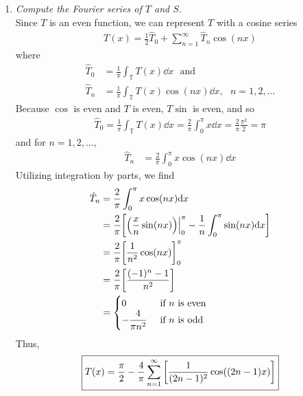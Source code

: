 \documentclass[fontsize=11pt]{article} %
\theoremstyle{plain}
\numberwithin{equation}{section} %
\numberwithin{figure}{section} %
\numberwithin{table}{section} %
\begin{document}
\begin{enumerate}[\bf (a)]
    \item
        \emph{Compute the Fourier series of $T$ and $S$.} \\

        Since $T$ is an even function, we can represent $T$ with a cosine series
        \begin{align*}
            T(x) = \frac{1}{2}\hat{T}_0 + \sum_{n=1}^\infty \hat{T}_n\cos(n x)
        \end{align*}
        where
        \begin{align*}
            \hat{T}_0 &= \frac{1}{\pi}\int_\mathbb{T} T(x) \dd x\ \ \ \text{and}\\
            \hat{T}_n &= \frac{1}{\pi}\int_\mathbb{T} T(x) \cos (nx) \dd x,\ \ \ n = 1, 2, \dots
        \end{align*}
        Because $\cos$ is even and $T$ is even, $T \sin$ is even, and so
        \begin{align*}
            \hat{T}_0 = \frac{1}{\pi}\int_\mathbb{T} T(x) \dd x = \frac{2}{\pi}\int_0^\pi x \dd x = \frac{2}{\pi}\frac{\pi^2}{2} = \pi
        \end{align*}
        and for $n = 1, 2, \dots$,
        \begin{align*}
            \hat{T}_n &= \frac{2}{\pi}\int_0^\pi x\cos(nx) \dd x
        \end{align*}
        Utilizing integration by parts, we find
        \begin{align*}
            \hat{T}_n &= \frac{2}{\pi}\int_0^\pi x \cos (nx) \dd x \\
            &= \frac{2}{\pi}\qty[\qty(\frac{x}{n}\sin (nx))\Big|_0^\pi -\frac{1}{n}\int_0^\pi \sin(nx)\dd x] \\
            &= \frac{2}{\pi}\qty[\frac{1}{n^2}\cos (nx)]_0^\pi \\
            &= \frac{2}{\pi}\qty[\frac{(-1)^n - 1}{n^2}] \\
            &= \begin{cases}
                0 & \text{ if $n$ is even} \\
                -\dfrac{4}{\pi n^2} & \text{ if $n$ is odd}
            \end{cases}
        \end{align*}
        Thus,
        \begin{align*}
            \boxed{T(x) = \frac{\pi}{2} - \frac{4}{\pi}\sum_{n=1}^\infty \qty[\frac{1}{(2n-1)^2}\cos((2n-1)x)]}
        \end{align*}

\end{enumerate}
\end{document}
